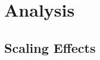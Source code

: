 \documentclass{llmxive}
\begin{document}
\section{Analysis}

\subsection{Scaling Effects}



\end{document}
